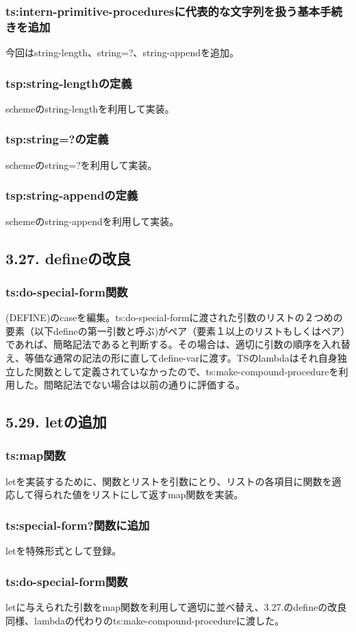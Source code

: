 \documentclass{jarticle}
\begin{document}
\subsubsection{ts:intern-primitive-proceduresに代表的な文字列を扱う基本手続きを追加}
今回はstring-length、string=?、string-appendを追加。
\subsubsection{tsp:string-lengthの定義}
schemeのstring-lengthを利用して実装。\par
\subsubsection{tsp:string=?の定義}
schemeのstring=?を利用して実装。\par
\subsubsection{tsp:string-appendの定義}
schemeのstring-appendを利用して実装。\par

\subsection{3.27. defineの改良}
\subsubsection{ts:do-special-form関数}
(DEFINE)のcaseを編集。ts:do-special-formに渡された引数のリストの２つめの要素（以下defineの第一引数と呼ぶ)がペア（要素１以上のリストもしくはペア）であれば、簡略記法であると判断する。その場合は、適切に引数の順序を入れ替え、等価な通常の記法の形に直してdefine-varに渡す。TSのlambdaはそれ自身独立した関数として定義されていなかったので、ts:make-compound-procedureを利用した。間略記法でない場合は以前の通りに評価する。\par

\subsection{5.29. letの追加}
\subsubsection{ts:map関数}
letを実装するために、関数とリストを引数にとり、リストの各項目に関数を適応して得られた値をリストにして返すmap関数を実装。\par
\subsubsection{ts:special-form?関数に追加}
letを特殊形式として登録。\par
\subsubsection{ts:do-special-form関数}
letに与えられた引数をmap関数を利用して適切に並べ替え、3.27.のdefineの改良同様、lambdaの代わりのts:make-compound-procedureに渡した。\par
\end{document}
